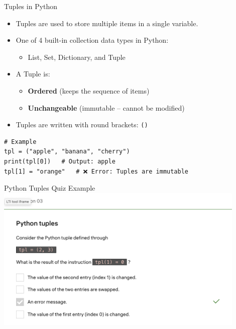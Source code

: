 \documentclass[aspectratio=169]{beamer}
\begin{document}
\begin{frame}[fragile]{Tuples in Python}
\begin{itemize}
  \item Tuples are used to store multiple items in a single variable.
  \item One of 4 built-in collection data types in Python:
    \begin{itemize}
      \item List, Set, Dictionary, and Tuple
    \end{itemize}
  \item A Tuple is:
    \begin{itemize}
      \item \textbf{Ordered} (keeps the sequence of items)
      \item \textbf{Unchangeable} (immutable – cannot be modified)
    \end{itemize}
  \item Tuples are written with round brackets: \texttt{()}
\end{itemize}

\begin{verbatim}
# Example
tpl = ("apple", "banana", "cherry")
print(tpl[0])   # Output: apple
tpl[1] = "orange"   # ❌ Error: Tuples are immutable
\end{verbatim}
\end{frame}

\begin{frame}{Python Tuples Quiz Example}
  \centering
  \includegraphics[width=0.9\textwidth]{tuples_quiz.png}
\end{frame}
\end{document}
